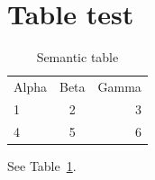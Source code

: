 \documentclass{article}
\begin{document}
\section{Table test}
\begin{table}[htbp]
\centering
\begin{tabular}{lcr}
Alpha & Beta & Gamma \\
1 & 2 & 3 \\
4 & 5 & 6 \\
\end{tabular}
\caption{Semantic table}
\label{tab:semantic}
\end{table}
See Table~\ref{tab:semantic}.
\end{document}
